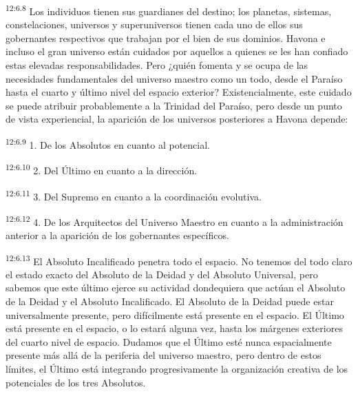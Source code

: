 \par
\textsuperscript{12:6.8} Los individuos tienen sus guardianes del destino; los planetas, sistemas, constelaciones, universos y superuniversos tienen cada uno de ellos sus gobernantes respectivos que trabajan por el bien de sus dominios. Havona e incluso el gran universo están cuidados por aquellos a quienes se les han confiado estas elevadas responsabilidades. Pero ¿quién fomenta y se ocupa de las necesidades fundamentales del universo maestro como un todo, desde el Paraíso hasta el cuarto y último nivel del espacio exterior? Existencialmente, este cuidado se puede atribuir probablemente a la Trinidad del Paraíso, pero desde un punto de vista experiencial, la aparición de los universos posteriores a Havona depende:

\par
\textsuperscript{12:6.9} 1. De los Absolutos en cuanto al potencial.

\par
\textsuperscript{12:6.10} 2. Del Último en cuanto a la dirección.

\par
\textsuperscript{12:6.11} 3. Del Supremo en cuanto a la coordinación evolutiva.

\par
\textsuperscript{12:6.12} 4. De los Arquitectos del Universo Maestro en cuanto a la administración anterior a la aparición de los gobernantes específicos.

\par
\textsuperscript{12:6.13} El Absoluto Incalificado penetra todo el espacio. No tenemos del todo claro el estado exacto del Absoluto de la Deidad y del Absoluto Universal, pero sabemos que este último ejerce su actividad dondequiera que actúan el Absoluto de la Deidad y el Absoluto Incalificado. El Absoluto de la Deidad puede estar universalmente presente, pero difícilmente está presente en el espacio. El Último está presente en el espacio, o lo estará alguna vez, hasta los márgenes exteriores del cuarto nivel de espacio. Dudamos que el Último esté nunca espacialmente presente más allá de la periferia del universo maestro, pero dentro de estos límites, el Último está integrando progresivamente la organización creativa de los potenciales de los tres Absolutos.

